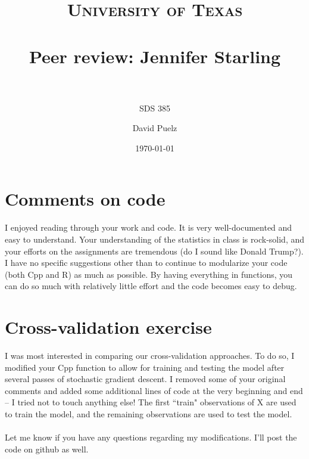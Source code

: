 \documentclass[paper=a4, fontsize=11pt]{scrartcl} %
\title{	
\normalfont \normalsize 
\textsc{University of Texas} \\ [25pt] %
\horrule{0.1pt} \\[.5cm] %
\huge Peer review: Jennifer Starling \\ %
\horrule{.1pt} \\[0cm] %
}
\subtitle{SDS 385}
\author{David Puelz} %
\date{\normalsize\today} %
\numberwithin{equation}{section} %
\numberwithin{figure}{section} %
\numberwithin{table}{section} %
\begin{document}
\maketitle
\tableofcontents
\newpage



\section{Comments on code}

I enjoyed reading through your work and code.  It is very well-documented and easy to understand. Your understanding of the statistics in class is rock-solid, and your efforts on the assignments are tremendous (do I sound like Donald Trump?).  I have no specific suggestions other than to continue to modularize your code (both Cpp and R) as much as possible.  By having everything in functions, you can do so much with relatively little effort and the code becomes easy to debug.

\section{Cross-validation exercise}

I was most interested in comparing our cross-validation approaches.  To do so, I modified your Cpp function to allow for training and testing the model after several passes of stochastic gradient descent.  I removed some of your original comments and added some additional lines of code at the very beginning and end -- I tried not to touch anything else!  The first ``train" observations of X are used to train the model, and the remaining observations are used to test the model.
\\
\\
Let me know if you have any questions regarding my modifications.  I'll post the code on github as well. 
\end{document}
